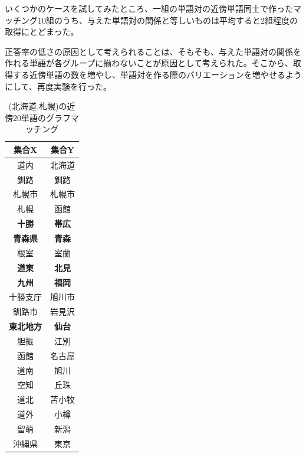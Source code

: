 いくつかのケースを試してみたところ、一組の単語対の近傍単語同士で作ったマッチング10組のうち、与えた単語対の関係と等しいものは平均すると2組程度の取得にとどまった。

正答率の低さの原因として考えられることは、そもそも、与えた単語対の関係を作れる単語が各グループに揃わないことが原因として考えられた。そこから、取得する近傍単語の数を増やし、単語対を作る際のバリエーションを増やせるようにして、再度実験を行った。

\begin{table}[!h]
  \begin{minipage}[t]{.45\textwidth}
    \caption[(北海道,札幌)の近傍20単語のグラフマッチング]{(北海道,札幌)の近傍20単語のグラフマッチング}
    \label{}
    \begin{center}
      \begin{tabular}{|c||c|} \hline
        集合X & 集合Y \\ \hline \hline
        道内 & 北海道 \\
        釧路 & 釧路 \\
        札幌市 & 札幌市 \\
        札幌 & 函館 \\
        \textbf{十勝} & \textbf{帯広} \\
        \textbf{青森県} & \textbf{青森} \\
        根室 & 室蘭 \\
        \textbf{道東} & \textbf{北見} \\
        \textbf{九州} & \textbf{福岡} \\
        十勝支庁 & 旭川市 \\ \hline
        釧路市 & 岩見沢 \\
        \textbf{東北地方} & \textbf{仙台} \\
        胆振 & 江別 \\
        函館 & 名古屋 \\
        道南 & 旭川 \\
        空知 & 丘珠 \\
        道北 & 苫小牧 \\
        道外 & 小樽 \\
        留萌 & 新潟 \\
        沖縄県 & 東京 \\ \hline
      \end{tabular}
    \end{center}
  \end{minipage}
  \hfill
  \begin{minipage}[t]{.45\textwidth}

\end{minipage}
\end{table}
